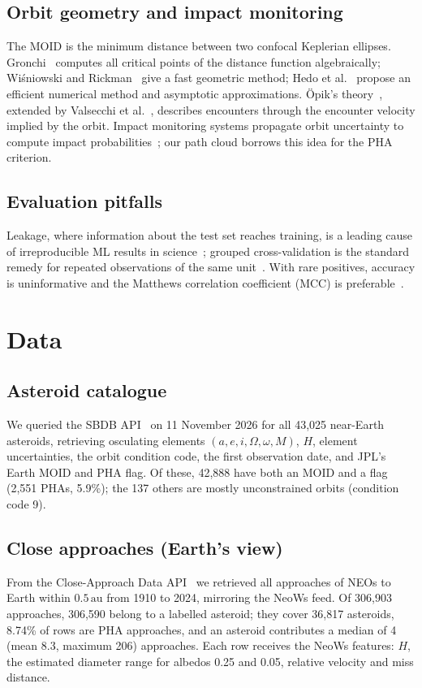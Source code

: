 \documentclass[make,article,submit,moreauthors]{Definitions/mdpi}
\newcommand{\au}{\,\mathrm{au}}
\begin{document}
\subsection{Orbit geometry and impact monitoring}
The MOID is the minimum distance between two confocal Keplerian ellipses. Gronchi~\cite{gronchi2005} computes all critical points of the distance function algebraically; Wi\'{s}niowski and Rickman~\cite{wisniowski2013} give a fast geometric method; Hedo et al.~\cite{hedo2018,hedo2020} propose an efficient numerical method and asymptotic approximations. \"{O}pik's theory~\cite{opik1976}, extended by Valsecchi et al.~\cite{valsecchi2003}, describes encounters through the encounter velocity implied by the orbit. Impact monitoring systems propagate orbit uncertainty to compute impact probabilities~\cite{milani2005,roa2021,milani_gronchi2009}; our path cloud borrows this idea for the PHA criterion.

\subsection{Evaluation pitfalls}
Leakage, where information about the test set reaches training, is a leading cause of irreproducible ML results in science~\cite{kaufman2012,kapoor2023}; grouped cross-validation is the standard remedy for repeated observations of the same unit~\cite{roberts2017}. With rare positives, accuracy is uninformative and the Matthews correlation coefficient (MCC) is preferable~\cite{chicco2020}.

\section{Data}

\subsection{Asteroid catalogue}
We queried the SBDB API~\cite{jpl_sbdb_api} on 11 November 2026 for all 43,025 near-Earth asteroids, retrieving osculating elements $(a, e, i, \Omega, \omega, M)$, $H$, element uncertainties, the orbit condition code, the first observation date, and JPL's Earth MOID and PHA flag. Of these, 42,888 have both an MOID and a flag (2,551 PHAs, 5.9\%); the 137 others are mostly unconstrained orbits (condition code 9).

\subsection{Close approaches (Earth's view)}\label{sec:cad}
From the Close-Approach Data API~\cite{jpl_cad_api} we retrieved all approaches of NEOs to Earth within $0.5\au$ from 1910 to 2024, mirroring the NeoWs feed. Of 306,903 approaches, 306,590 belong to a labelled asteroid; they cover 36,817 asteroids, 8.74\% of rows are PHA approaches, and an asteroid contributes a median of 4 (mean 8.3, maximum 206) approaches. Each row receives the NeoWs features: $H$, the estimated diameter range for albedos 0.25 and 0.05, relative velocity and miss distance.
\end{document}
